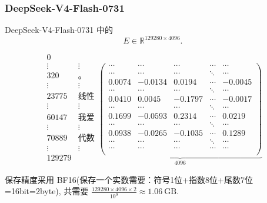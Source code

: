 \begin{frame}\frametitle{DeepSeek-V4-Flash-0731}

DeepSeek-V4-Flash-0731 中的
\[E\in \mathbb R^{129280\times 4096}.\]


\[
\begin{array}{cc}
0 & \\
\vdots & \vdots \\
320 & \text{。} \\
\vdots & \vdots \\
23775 & \text{线性} \\
\vdots &\vdots  \\
60147 & \text{我爱} \\
\vdots & \vdots \\
70889 & \text{代数} \\
\vdots & \vdots \\
129279 & \\
\end{array}
\underbrace{\left(\begin{array}{rrrrrr}
\cdots & \cdots & \cdots & \cdots & \cdots \\
\cdots & \cdots & \cdots & \ddots & \cdots \\
0.0074 & -0.0134 & 0.0194 & \cdots & -0.0045 \\
\cdots & \cdots & \cdots & \ddots & \cdots \\
0.0410 & 0.0045 & -0.1797 & \cdots & -0.0017\\
\cdots & \cdots & \cdots & \ddots & \cdots \\
0.1699 & -0.0593 & 0.2314 & \cdots & 0.0219\\
\cdots & \cdots & \cdots & \ddots & \cdots \\
0.0938 & -0.0265 & -0.1035 & \cdots & 0.1289\\
\cdots & \cdots & \cdots & \ddots & \cdots \\
\cdots & \cdots & \cdots & \cdots & \cdots \\
\end{array}\right)}_{4096}
\]

保存精度采用 BF16(保存一个实数需要：符号1位+指数8位+尾数7位=16bit=2byte), 共需要
$\frac{129280 \times 4096 \times 2}{10^9} \approx 1.06\ \mathrm{GB}$.

\end{frame}










